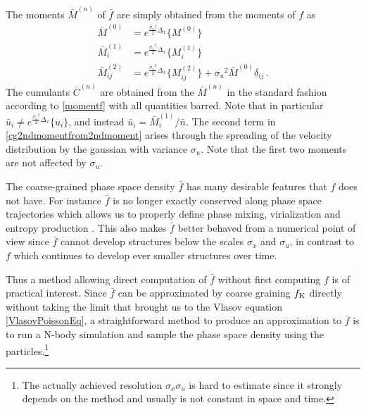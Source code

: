 \documentclass[twocolumn, nofootinbib, showpacs, superscriptaddress]{revtex4-1}
\newcommand{\sigu}{{\sigma_{\! u}}}
\newcommand{\sigx}{{\sigma_{\! x}}}
\begin{document}
The moments $\bar M^{(n)}$ of $\bar f$ are simply obtained from the moments of $f$ as
\begin{subequations}\label{cgmomentsfrommoments}
\begin{align}
\bar M^{(0)}& = e^{\frac{\sigx^2}{2}\Delta_x} \{ M^{(0)} \}  \\
\bar M^{(1)}_i &= e^{\frac{\sigx^2}{2}\Delta_x} \{ M^{(1)}_i \}  \\
\bar M^{(2)}_{ij}& = e^{\frac{\sigx^2}{2}\Delta_x} \{ M^{(2)}_{ij} \}  + \sigu^2 \bar M^{(0)} \delta_{ij}   \,. \label{cg2ndmomentfrom2ndmoment}
\end{align}
\end{subequations}
The cumulants $\bar C^{(n)} $ are obtained from the $\bar M^{(n)}$ in the standard fashion according to \eqref{momentf} with all quantities barred. 
Note that in particular $\bar u_i \neq e^{\frac{\sigx^2}{2}\Delta_x} \{ u_i \}  $, and instead $\bar u_i  = \bar M^{(1)}_i/ \bar n$.
The second term in \eqref{cg2ndmomentfrom2ndmoment} arises through the spreading of the velocity distribution by the gaussian with variance $\sigu$. Note that the first two moments are not affected by $\sigu$.

The coarse-grained phase space density $\bar f$ has many desirable features that $f$ does not have. 
For instance $\bar f$ is no longer exactly conserved along phase space trajectories which allows us to properly define phase mixing,
 virialization and entropy production \cite{L67, MW03}.
This also makes $\bar f$ better behaved from a numerical point of view since $\bar f$ cannot develop structures below 
the scales $\sigx$ and $\sigu$, in contrast to $f$ which continues to develop ever smaller structures over time.

Thus a method allowing direct computation of $\bar f$ without first computing $f$ is of practical interest.
Since $\bar f$ can be approximated by coarse graining $f_{\rm K}$ directly without taking the limit that brought us to the Vlasov equation \eqref{VlasovPoissonEq}, a straightforward method to produce an approximation to $\bar f$ is to run a N-body simulation  \cite{T02,SWF05,SWF06,SW09,AHK12,HAK13,HahnAngulo2016,SousbieColombi2016} and sample  the phase space density using the particles.\footnote{The actually achieved resolution $\sigx \sigu$ is hard to estimate since it strongly depends on the method and usually is not constant in space and time.}
\end{document}
